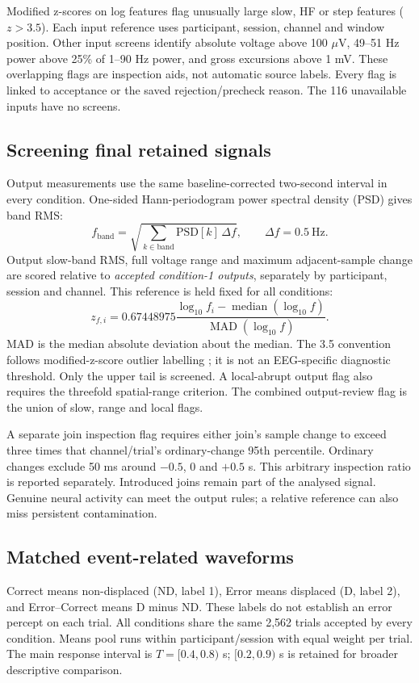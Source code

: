 \documentclass[11pt,a4paper]{article}
\newcommand{\uv}{\ensuremath{\mu\mathrm{V}}}
\begin{document}
Modified z-scores on log features flag unusually large slow, HF or step features ($z>3.5$). Each input reference uses participant, session, channel and window position. Other input screens identify absolute voltage above 100 \uv, 49--51 Hz power above 25\% of 1--90 Hz power, and gross excursions above 1 mV. These overlapping flags are inspection aids, not automatic source labels. Every flag is linked to acceptance or the saved rejection/precheck reason. The 116 unavailable inputs have no screens.
\subsection{Screening final retained signals}
Output measurements use the same baseline-corrected two-second interval in every condition. One-sided Hann-periodogram power spectral density (PSD) gives band RMS:
\[
f_{\mathrm{band}}=\sqrt{\sum_{k\in\mathrm{band}}\mathrm{PSD}[k]\,\Delta f},\qquad\Delta f=0.5\ \mathrm{Hz}.
\]
Output slow-band RMS, full voltage range and maximum adjacent-sample change are scored relative to \emph{accepted condition-1 outputs}, separately by participant, session and channel. This reference is held fixed for all conditions:
\[
z_{f,i}=0.67448975\frac{\log_{10}f_i-\operatorname{median}(\log_{10}f)}{\operatorname{MAD}(\log_{10}f)}.
\]
MAD is the median absolute deviation about the median. The 3.5 convention follows modified-z-score outlier labelling \cite{nist}; it is not an EEG-specific diagnostic threshold. Only the upper tail is screened. A local-abrupt output flag also requires the threefold spatial-range criterion. The combined output-review flag is the union of slow, range and local flags.

A separate join inspection flag requires either join's sample change to exceed three times that channel/trial's ordinary-change 95th percentile. Ordinary changes exclude 50 ms around $-0.5$, 0 and $+0.5$ s. This arbitrary inspection ratio is reported separately. Introduced joins remain part of the analysed signal. Genuine neural activity can meet the output rules; a relative reference can also miss persistent contamination.
\subsection{Matched event-related waveforms}
Correct means non-displaced (ND, label 1), Error means displaced (D, label 2), and Error--Correct means D minus ND. These labels do not establish an error percept on each trial. All conditions share the same 2,562 trials accepted by every condition. Means pool runs within participant/session with equal weight per trial. The main response interval is $T=[0.4,0.8)$ s; $[0.2,0.9)$ s is retained for broader descriptive comparison.
\end{document}
